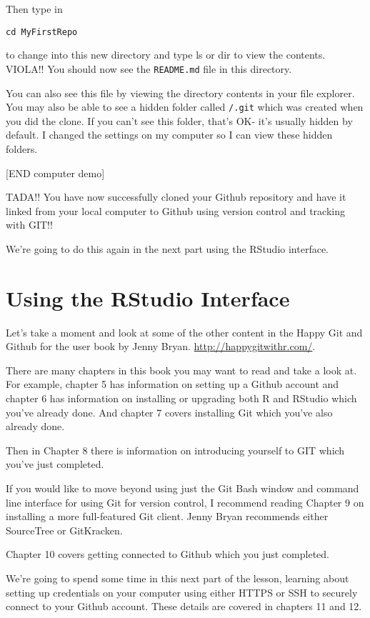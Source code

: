 \documentclass[]{book}
\theoremstyle{definition}
\theoremstyle{definition}
\theoremstyle{definition}
\theoremstyle{remark}
\begin{document}
Then type in

\texttt{cd\ MyFirstRepo}

to change into this new directory and type ls or dir to view the
contents. VIOLA!! You should now see the \texttt{README.md} file in this
directory.

You can also see this file by viewing the directory contents in your
file explorer. You may also be able to see a hidden folder called
\texttt{/.git} which was created when you did the clone. If you can't
see this folder, that's OK- it's usually hidden by default. I changed
the settings on my computer so I can view these hidden folders.

{[}END computer demo{]}

TADA!! You have now successfully cloned your Github repository and have
it linked from your local computer to Github using version control and
tracking with GIT!!

We're going to do this again in the next part using the RStudio
interface.

\section{Using the RStudio Interface}\label{using-the-rstudio-interface}

Let's take a moment and look at some of the other content in the Happy
Git and Github for the user book by Jenny Bryan.
\url{http://happygitwithr.com/}.

There are many chapters in this book you may want to read and take a
look at. For example, chapter 5 has information on setting up a Github
account and chapter 6 has information on installing or upgrading both R
and RStudio which you've already done. And chapter 7 covers installing
Git which you've also already done.

Then in Chapter 8 there is information on introducing yourself to GIT
which you've just completed.

If you would like to move beyond using just the Git Bash window and
command line interface for using Git for version control, I recommend
reading Chapter 9 on installing a more full-featured Git client. Jenny
Bryan recommends either SourceTree or GitKracken.

Chapter 10 covers getting connected to Github which you just completed.

We're going to spend some time in this next part of the lesson, learning
about setting up credentials on your computer using either HTTPS or SSH
to securely connect to your Github account. These details are covered in
chapters 11 and 12.
\end{document}
